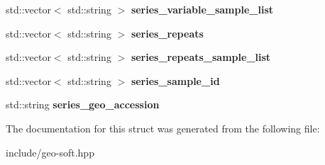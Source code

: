 \begin{DoxyCompactItemize}
std\+::vector$<$ std\+::string $>$ {\bfseries series\+\_\+variable\+\_\+sample\+\_\+list}
\item 
\mbox{\label{structGeoSoft_a54c0e3e994e01dc72664a3708d14ae16}} 
std\+::vector$<$ std\+::string $>$ {\bfseries series\+\_\+repeats}
\item 
\mbox{\label{structGeoSoft_aa1bb0eb5c8436bf24d09d462843db6e5}} 
std\+::vector$<$ std\+::string $>$ {\bfseries series\+\_\+repeats\+\_\+sample\+\_\+list}
\item 
\mbox{\label{structGeoSoft_a2e536d82e9a454cffdd09f1e41116d6f}} 
std\+::vector$<$ std\+::string $>$ {\bfseries series\+\_\+sample\+\_\+id}
\item 
\mbox{\label{structGeoSoft_a2b55873f4d70d00e58d01ee9f6dcce0d}} 
std\+::string {\bfseries series\+\_\+geo\+\_\+accession}
\end{DoxyCompactItemize}


The documentation for this struct was generated from the following file\+:\begin{DoxyCompactItemize}
\item 
include/geo-\/soft.\+hpp\end{DoxyCompactItemize}

